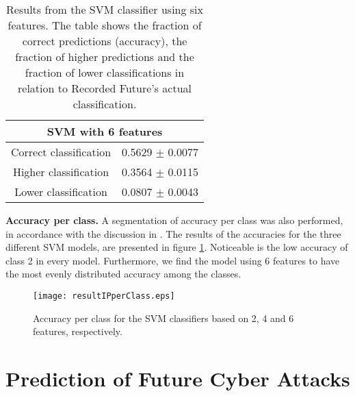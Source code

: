 \begin{table}[h!]
    \centering
    \caption{Results from the SVM classifier using six features. The table shows the fraction of correct predictions (accuracy), the fraction of higher predictions and the fraction of lower classifications in relation to Recorded Future's actual classification.}
    \begin{tabular}{|c|c|}
    \hline
        \multicolumn{2}{|c|}{SVM with 6 features}\\ \hline
        Correct classification  & 0.5629 $\pm$ 0.0077 \\
        Higher classification   & 0.3564 $\pm$ 0.0115 \\
        Lower classification    & 0.0807 $\pm$ 0.0043 \\ \hline
    \end{tabular}
    \label{IpRes}
\end{table}


\textbf{Accuracy per class.} A segmentation of accuracy per class was also performed, in accordance with the discussion in . The results of the accuracies for the three different SVM models, are presented in figure \ref{accuracyPerClass}. Noticeable is the low accuracy of class 2 in every model. Furthermore, we find the model using 6 features to have the most evenly distributed accuracy among the classes. 

\begin{figure}[h!]
    \centering
    \texttt{[image: resultIPperClass.eps]}
    \caption{Accuracy per class for the SVM classifiers based on 2, 4 and 6 features, respectively.}
    \label{accuracyPerClass}
\end{figure}

\FloatBarrier
\section{Prediction of Future Cyber Attacks}


